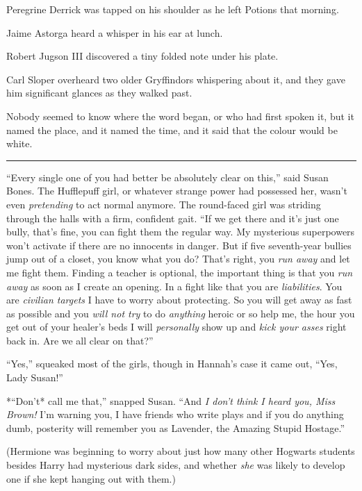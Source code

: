 Peregrine Derrick was tapped on his shoulder as he left Potions that
morning.

Jaime Astorga heard a whisper in his ear at lunch.

Robert Jugson III discovered a tiny folded note under his plate.

Carl Sloper overheard two older Gryffindors whispering about it, and
they gave him significant glances as they walked past.

Nobody seemed to know where the word began, or who had first spoken it,
but it named the place, and it named the time, and it said that the
colour would be white.

\begin{center}\rule{3in}{0.4pt}\end{center}

``Every single one of you had better be absolutely clear on this,'' said
Susan Bones. The Hufflepuff girl, or whatever strange power had
possessed her, wasn't even \emph{pretending} to act normal anymore. The
round-faced girl was striding through the halls with a firm, confident
gait. ``If we get there and it's just one bully, that's fine, you can
fight them the regular way. My mysterious superpowers won't activate if
there are no innocents in danger. But if five seventh-year bullies jump
out of a closet, you know what you do? That's right, you \emph{run away}
and let me fight them. Finding a teacher is optional, the important
thing is that you \emph{run away} as soon as I create an opening. In a
fight like that you are \emph{liabilities}. You are \emph{civilian
targets} I have to worry about protecting. So you will get away as fast
as possible and you \emph{will not try} to do \emph{anything} heroic or
so help me, the hour you get out of your healer's beds I will
\emph{personally} show up and \emph{kick your asses} right back in. Are
we all clear on that?''

``Yes,'' squeaked most of the girls, though in Hannah's case it came
out, ``Yes, Lady Susan!''

*``Don't* call me that,'' snapped Susan. ``And \emph{I don't think I
heard you, Miss Brown!} I'm warning you, I have friends who write plays
and if you do anything dumb, posterity will remember you as Lavender,
the Amazing Stupid Hostage.''

(Hermione was beginning to worry about just how many other Hogwarts
students besides Harry had mysterious dark sides, and whether \emph{she}
was likely to develop one if she kept hanging out with them.)

